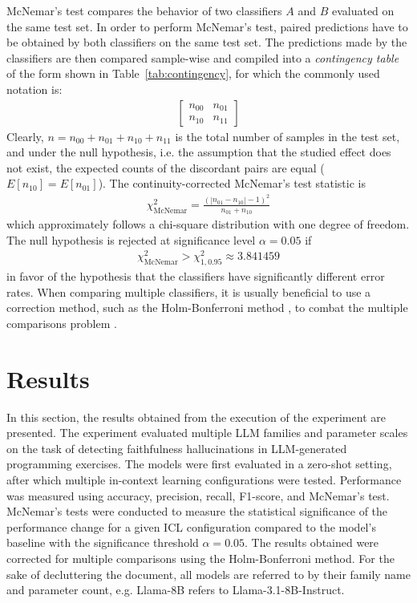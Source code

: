 \documentclass[english, 12pt, a4paper, sci, utf8, a-2b, online]{latex/definitions/aaltothesis}
\begin{document}
McNemar's test compares the behavior of two classifiers $A$ and $B$ evaluated on the same test set. In order to perform McNemar's test, paired predictions have to be obtained by  both classifiers on the same test set. The predictions made by the classifiers are then compared sample-wise and compiled into a \textit{contingency table} of the form shown in Table~\ref{tab:contingency}, for which the commonly used notation is:
\begin{align*}
    \begin{bmatrix}
    n_{00} & n_{01} \\
    n_{10} & n_{11}
    \end{bmatrix}
\end{align*}
Clearly, $n = n_{00} + n_{01} + n_{10} + n_{11}$ is the total number of samples in the test set, and under the null hypothesis, i.e. the assumption that the studied effect does not exist, the expected counts of the discordant pairs are equal ($E \left[ n_{10} \right] = E\left[ n_{01} \right]$). The continuity-corrected McNemar's test statistic is
\begin{align*}
    \chi^2_{\text{McNemar}} = \frac{(|n_{01} - n_{10}| - 1)^2}{n_{01} + n_{10}}
\end{align*}
which approximately follows a chi-square distribution with one degree of freedom. The null hypothesis is rejected at significance level $\alpha=0.05$ if
\begin{align*}
    \chi^2_{\text{McNemar}} > \chi_{1, 0.95}^2 \approx 3.841459
\end{align*}
in favor of the hypothesis that the classifiers have significantly different error rates. When comparing multiple classifiers, it is usually beneficial to use a correction method, such as the Holm-Bonferroni method \cite{29def780-e117-38f0-8afb-edf384af3fad}, to combat the multiple comparisons problem \cite{westfall2011multiple}.

\clearpage

\section{Results} \label{sec:results}

In this section, the results obtained from the execution of the experiment are presented. The experiment evaluated multiple LLM families and parameter scales on the task of detecting faithfulness hallucinations in LLM-generated programming exercises. The models were first evaluated in a zero-shot setting, after which multiple in-context learning configurations were tested. Performance was measured using accuracy, precision, recall, F1-score, and McNemar's test. McNemar's tests were conducted to measure the statistical significance of the performance change for a given ICL configuration compared to the model's baseline with the significance threshold $\alpha = 0.05$. The results obtained were corrected for multiple comparisons using the Holm-Bonferroni method. For the sake of decluttering the document, all models are referred to by their family name and parameter count, e.g. Llama-8B refers to Llama-3.1-8B-Instruct.
\end{document}
